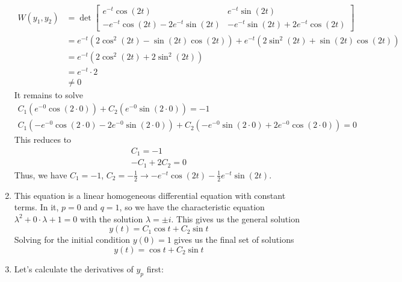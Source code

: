 \documentclass[12pt]{article}
\begin{document}
\begin{enumerate}
          \begin{align*}
              W(y_1, y_2) & =\det \begin{bmatrix}
                                      e^{-t}\cos(2t)                  & e^{-t}\sin(2t)                  \\
                                      -e^{-t}\cos(2t)-2e^{-t}\sin(2t) & -e^{-t}\sin(2t)+2e^{-t}\cos(2t)
                                  \end{bmatrix}                           \\
                          & = e^{-t}\left(2\cos^2(2t)-\sin(2t)\cos(2t)\right)+e^{-t}\left(2\sin^2(2t)+\sin(2t)\cos(2t)\right) \\
                          & = e^{-t} \left(2\cos^2(2t)+2\sin^2(2t)\right)                                                     \\
                          & = e^{-t} \cdot 2                                                                                  \\
                          & \ne 0
          \end{align*}
          It remains to solve
          \begin{gather*}
              C_1\left(e^{-0}\cos(2 \cdot 0)\right)+C_2\left(e^{-0}\sin(2 \cdot 0)\right)=-1 \\
              C_1\left(-e^{-0}\cos(2 \cdot 0)-2e^{-0}\sin(2 \cdot 0)\right)+C_2\left(-e^{-0}\sin(2 \cdot 0)+2e^{-0}\cos(2 \cdot 0)\right)=0
          \end{gather*}
          This reduces to
          \begin{gather*}
              C_1=-1 \\
              -C_1+2C_2=0
          \end{gather*}
          Thus, we have $C_1=-1$, $C_2=-\frac{1}{2} \rightarrow \boxed{-e^{-t}\cos(2t)-\frac{1}{2}e^{-t}\sin(2t)}$.
    \item This equation is a linear homogeneous differential equation with constant terms.
          In it, $p=0$ and $q=1$, so we have the characteristic equation
          $\lambda^2+0 \cdot \lambda + 1=0$ with the solution $\lambda = \pm i$.
          This gives us the general solution \[y(t)=C_1 \cos t + C_2 \sin t\]
          Solving for the initial condition $y(0)=1$ gives us the final set of solutions \label{list:4}
          \[\boxed{y(t)=\cos t + C_2\sin t}\]
    \item Let's calculate the derivatives of $y_p$ first:
          \begin{gather*}

\end{gather*}
\end{enumerate}
\end{document}
